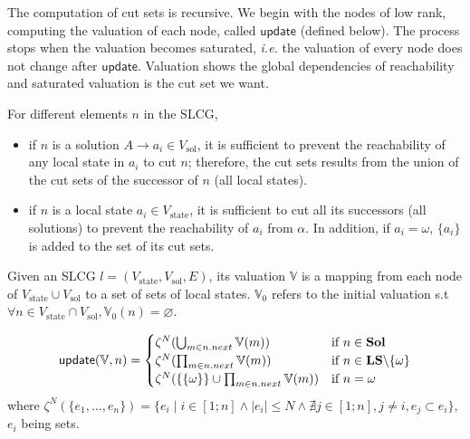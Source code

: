 The computation of cut sets is recursive.
We begin with the nodes of low rank, computing the valuation of each node, called $\mathsf{update}$ (defined below).
The process stops when the valuation becomes saturated, \textit{i.e.} the valuation of every node does not change after $\mathsf{update}$.
Valuation shows the global dependencies of reachability and saturated valuation is the cut set we want.

For different elements $n$ in the SLCG,  

\begin{itemize}
\item if $n$ is a solution $A\to a_i \in V_{\mathrm{sol}}$, it is sufficient to prevent the reachability of any local state in $a_i$ to cut $n$; therefore, the cut sets results from the union
of the cut sets of the successor of $n$ (all local states).
\item if $n$ is a local state $a_i\in V_{\mathrm{state}}$, it is sufficient to cut all its successors (all solutions) to prevent the reachability of $a_i$ from $\alpha$. 
In addition, if $a_i=\omega$, $\{a_i\}$ is added to the set of its cut sets.
\end{itemize}

\begin{definition}[Valuation]\label{def:valuation}
Given an SLCG $l= (V_{\mathrm{state}},V_{\mathrm{sol}},E)$, its valuation $\mathbb{V}$ is a mapping from each node of $V_{\mathrm{state}}\cup V_{\mathrm{sol}}$ to a set of sets of local states.
$\mathbb{V}_0$ refers to the initial valuation s.t $\forall n \in V_{\mathrm{state}}\cap V_{\mathrm{sol}}, \mathbb{V}_0(n)=\varnothing$.
\end{definition}


\begin{definition}
\begin{equation}  
\mathsf{update}(\mathbb{V},n)= 
      \begin{cases}
            \zeta^N(\bigcup_{m\in n.next}\mathbb{V}(m))&\text{if } n\in\mathbf{Sol}\\
            \zeta^N(\prod_{m\in n.next}\mathbb{V}(m))&\text{if } n\in\mathbf{LS}\miset{\omega}\\
            \zeta^N(\{\{\omega\}\}\cup\prod_{m\in n.next}\mathbb{V}(m))&\text{if }n=\omega\\
      \end{cases}
\end{equation}
where $\zeta^N(\{e_1,\ldots,e_n\})=\{e_i\mid i\in[1;n]\land |e_i|\leq N\land\nexists j\in[1;n],j\neq i,e_j\subset e_i\}$, $e_i$ being sets.
\end{definition}

